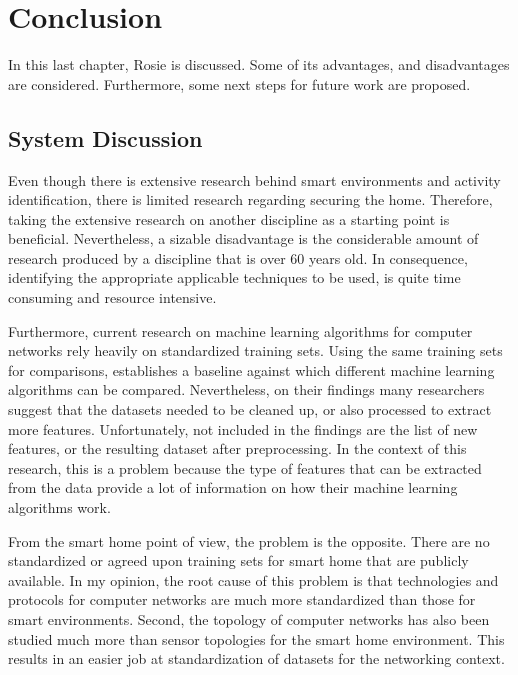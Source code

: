 \chapter{Conclusion}
In this last chapter, Rosie is discussed. Some of its advantages, and disadvantages are considered. Furthermore, some next steps for future work are proposed.



\section{System Discussion}

Even though there is extensive research behind smart environments and activity identification, there is limited research regarding securing the home. Therefore, taking the extensive research on another discipline as a starting point is beneficial. Nevertheless, a sizable disadvantage is the considerable amount of research produced by a discipline that is over 60 years old. In consequence, identifying the appropriate applicable techniques to be used, is quite time consuming and resource intensive. 

Furthermore, current research on machine learning algorithms for computer networks rely heavily on standardized training sets. Using the same training sets for comparisons, establishes a baseline against which different machine learning algorithms can be compared. Nevertheless, on their findings many researchers suggest that the datasets needed to be cleaned up, or also processed to extract more features. Unfortunately, not included in the findings are the list of new features, or the resulting dataset after preprocessing. In the context of this research, this is a problem because the type of features that can be extracted from the data provide a lot of information on how their machine learning algorithms work.

From the smart home point of view, the problem is the opposite. There are no standardized or agreed upon training sets for smart home that are publicly available. In my opinion, the root cause of this problem is that technologies and protocols for computer networks are much more standardized than those for smart environments. Second, the topology of computer networks has also been studied much more than sensor topologies for the smart home environment. This results in an easier job at standardization of datasets for the networking context.

